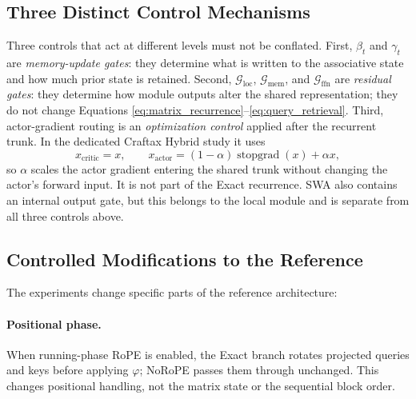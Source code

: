 \subsection{Three Distinct Control Mechanisms}
Three controls that act at different levels must not be conflated. First,
$\beta_t$ and $\gamma_t$ are \emph{memory-update gates}: they determine what is
written to the associative state and how much prior state is retained. Second,
$\mathcal{G}_{\mathrm{loc}}$, $\mathcal{G}_{\mathrm{mem}}$, and
$\mathcal{G}_{\mathrm{ffn}}$ are \emph{residual gates}: they determine how module
outputs alter the shared representation; they do not change Equations
\ref{eq:matrix_recurrence}--\ref{eq:query_retrieval}. Third, actor-gradient
routing is an \emph{optimization control} applied after the recurrent trunk. In
the dedicated Craftax Hybrid study it uses
\begin{equation}
x_{\mathrm{critic}}=x,\qquad
x_{\mathrm{actor}}=(1-\alpha)\operatorname{stopgrad}(x)+\alpha x,
\label{eq:ggs}
\end{equation}
so $\alpha$ scales the actor gradient entering the shared trunk without changing
the actor's forward input. It is not part of the Exact recurrence. SWA also
contains an internal output gate, but this belongs to the local module and is
separate from all three controls above.

\subsection{Controlled Modifications to the Reference}
The experiments change specific parts of the reference architecture:

\paragraph{Positional phase.}
When running-phase RoPE is enabled, the Exact branch rotates projected queries
and keys before applying $\varphi$; NoRoPE passes them through unchanged. This
changes positional handling, not the matrix state or the sequential block order.

